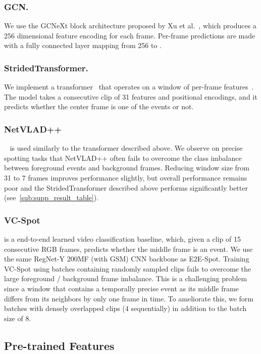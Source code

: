 \documentclass[runningheads]{llncs}
\newcommand{\OURMETHOD}{{E2E-Spot}\xspace}
\begin{document}
\subsubsection*{GCN.}
We use the GCNeXt block architecture proposed by Xu et al.~\cite{gtad}, which produces a 256 dimensional feature encoding for each frame.
Per-frame predictions are made with a fully connected layer mapping from 256 to .

\subsubsection*{StridedTransformer.}
We implement a transformer~\cite{pytorchtransformer} that operates on a window of per-frame features~\cite{featurecombattention}.
The model takes a consecutive clip of 31 features and positional encodings, and it predicts whether the center frame is one of the  events or not.

\subsubsection*{NetVLAD++}~\cite{netvladpp} is used similarly to the transformer described above.
We observe on precise spotting tasks that NetVLAD++ often fails to overcome the class imbalance between foreground events and background frames.
Reducing window size from 31 to 7 frames improves performance slightly, but overall performance remains poor and the StridedTransformer described above performs significantly better (see~\autoref{sub:supp_result_table}).

\subsubsection*{VC-Spot} is a end-to-end learned video classification baseline, which, given a clip of 15 consecutive RGB frames, predicts whether the middle frame is an event. We use the same RegNet-Y 200MF (with GSM) CNN backbone as \OURMETHOD.
Training VC-Spot using batches containing randomly sampled clips fails to overcome the large foreground / background frame imbalance.
This is a challenging problem since a window that contains a temporally precise event as its middle frame differs from its neighbors by only one frame in time.
To ameliorate this, we form batches with densely overlapped clips (4 sequentially) in addition to the batch size of 8.

\subsection{Pre-trained Features}
\label{sub:supp_pretrained_features}
\end{document}
